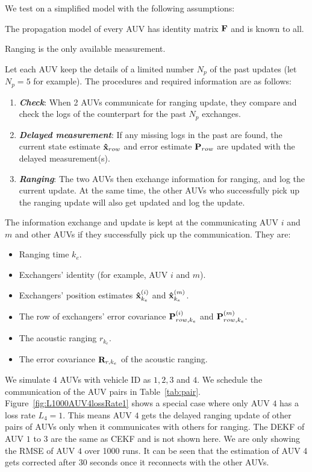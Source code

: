 We test on a simplified model with the following assumptions:

\begin{assumption}\label{as:1}
  The propagation model of every AUV has identity matrix $\bf F$ and is known to all.
\end{assumption}

\begin{assumption}\label{as:2}
  Ranging is the only available measurement.
\end{assumption}

Let each AUV keep the details of a limited number $N_p$ of the past updates (let $N_p=5$ for example).
The procedures and required information are as follows:
\begin{enumerate}
  \item \textbf{\textit{Check}}: When 2 AUVs communicate for ranging update, they compare and check the logs of the counterpart for the past $N_p$ exchanges.
  \item \textbf{\textit{Delayed measurement}}: If any missing logs in the past are found, the current state estimate ${\bf \hat x}_{row}$ and error estimate ${\bf P}_{row}$ are updated with the delayed measurement(s).
  \item \textbf{\textit{Ranging}}: The two AUVs then exchange information for ranging, and log the current update. At the same time, the other AUVs who successfully pick up the ranging update will also get updated and log the update.
\end{enumerate}

The information exchange and update is kept at the communicating AUV $i$ and $m$ and other AUVs if they successfully pick up the communication. They are:
\begin{itemize}
  \item Ranging time $k_e$.
  \item Exchangers' identity (for example, AUV $i$ and $m$).
  \item Exchangers' position estimates ${\bf \hat x}_{k_e}^{(i)}$ and ${\bf \hat x}_{k_e}^{(m)}$.
  \item The row of exchangers' error covariance ${\bf P}_{row,k_e}^{(i)}$ and ${\bf P}_{row,k_e}^{(m)}$.
  \item The acoustic ranging $r_{k_e}$.
  \item The error covariance ${\bf R}_{r,k_e}$ of the acoustic ranging.
\end{itemize}

We simulate 4 AUVs with vehicle ID as $1,2,3$ and $4$. We schedule the communication of the AUV pairs in Table~\ref{tab:pair}. Figure~\ref{fig:L1000AUV4lossRate1} shows a special case where only AUV $4$ has a loss rate $L_4=1$. This means AUV $4$ gets the delayed ranging update of other pairs of AUVs only when it communicates with others for ranging. The DEKF of AUV $1$ to $3$ are the same as CEKF and is not shown here. We are only showing the RMSE of AUV $4$ over 1000 runs. It can be seen that the estimation of AUV 4 gets corrected after 30 seconds once it reconnects with the other AUVs.

